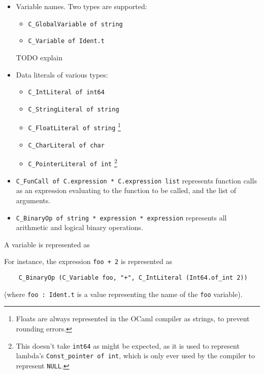 \documentclass[12pt,a4paper,twoside,openright]{report}
\begin{document}
\begin{itemize}
    \begin{itemize}
        \item Variable names. Two types are supported:
            \begin{itemize}
                \item \lstinline!C_GlobalVariable of string!
                \item \lstinline!C_Variable of Ident.t!
            \end{itemize}
            TODO explain
        \item Data literals of various types:
            \begin{itemize}
                \item \lstinline!C_IntLiteral of int64!
                \item \lstinline!C_StringLiteral of string!
                \item \lstinline!C_FloatLiteral of string! \footnote{Floats are
                    always represented in the OCaml compiler as strings, to
                    prevent rounding errors.}
                \item \lstinline!C_CharLiteral of char!
                \item \lstinline!C_PointerLiteral of int! \footnote{This
                    doesn't take \lstinline!int64! as might be expected, as it
                    is used to represent lambda's \lstinline!Const_pointer of int!,
                    which is only ever used by the compiler to represent
                    \lstinline!NULL!.}
            \end{itemize}
        \item \lstinline!C_FunCall of C.expression * C.expression list!
            represents function calls as an expression evaluating to the
            function to be called, and the list of arguments.
        \item \lstinline!C_BinaryOp of string * expression * expression!
            represents all arithmetic and logical binary operations.
    \end{itemize}

    A variable is represented as 

    For instance, the expression \lstinline!foo + 2! is represented as
    \begin{lstlisting}
    C_BinaryOp (C_Variable foo, "+", C_IntLiteral (Int64.of_int 2))\end{lstlisting}%
    (where \lstinline!foo : Ident.t! is a value representing the name of the
    \lstinline!foo! variable).


\end{itemize}
\end{document}
